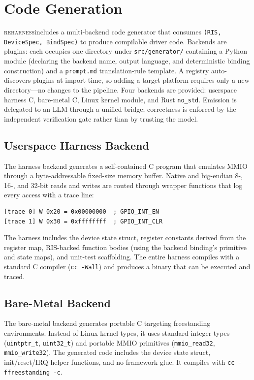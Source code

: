 \documentclass[sigplan, screen, review, anonymous]{acmart}
\newcommand{\reharness}{\textsc{reharness}}
\begin{document}
\section{Code Generation}

\reharness includes a multi-backend code generator that consumes \texttt{(RIS, DeviceSpec, BindSpec)} to produce compilable driver code. Backends are plugins: each occupies one directory under \texttt{src/generator/} containing a Python module (declaring the backend name, output language, and deterministic binding construction) and a \texttt{prompt.md} translation-rule template. A registry auto-discovers plugins at import time, so adding a target platform requires only a new directory---no changes to the pipeline. Four backends are provided: userspace harness C, bare-metal C, Linux kernel module, and Rust \texttt{no\_std}. Emission is delegated to an LLM through a unified bridge; correctness is enforced by the independent verification gate rather than by trusting the model.

\subsection{Userspace Harness Backend}

The harness backend generates a self-contained C program that emulates MMIO through a byte-addressable fixed-size memory buffer. Native and big-endian 8-, 16-, and 32-bit reads and writes are routed through wrapper functions that log every access with a trace line:

\begin{lstlisting}
[trace 0] W 0x20 = 0x00000000  ; GPIO_INT_EN
[trace 1] W 0x30 = 0xffffffff  ; GPIO_INT_CLR
\end{lstlisting}

The harness includes the device state struct, register constants derived from the register map, RIS-backed function bodies (using the backend binding's primitive and state maps), and unit-test scaffolding. The entire harness compiles with a standard C compiler (\texttt{cc -Wall}) and produces a binary that can be executed and traced.

\subsection{Bare-Metal Backend}

The bare-metal backend generates portable C targeting freestanding environments. Instead of Linux kernel types, it uses standard integer types (\texttt{uintptr\_t}, \texttt{uint32\_t}) and portable MMIO primitives (\texttt{mmio\_read32}, \texttt{mmio\_write32}). The generated code includes the device state struct, init/reset/IRQ helper functions, and no framework glue. It compiles with \texttt{cc -ffreestanding -c}.
\end{document}
